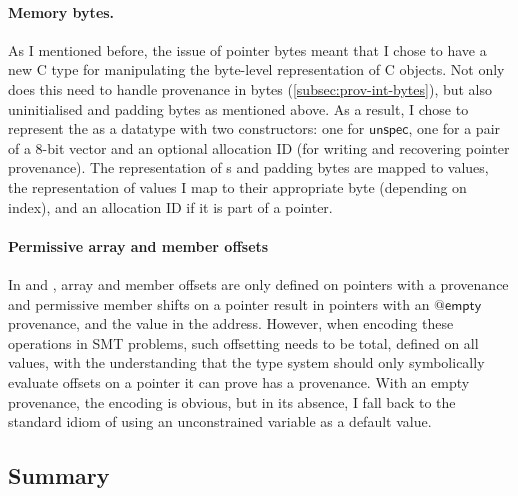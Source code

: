 \paragraph{Memory bytes.}%
As I mentioned before, the issue of pointer bytes meant that I chose to have a
new C type for manipulating the byte-level representation of C objects. Not
only does this need to handle provenance in bytes
(\cref{subsec:prov-int-bytes}), but also uninitialised and padding bytes as
mentioned above. As a result, I chose to represent the  as
a datatype with two constructors: one for $\mathsf{unspec}$, one for a pair of
a 8-bit vector and an optional allocation ID (for writing and recovering
pointer provenance). The representation of s and padding bytes
are mapped to  values, the representation of 
values I map to their appropriate byte (depending on
index), and an allocation ID if it is part of a pointer.

\paragraph{Permissive array and member offsets}%
In  and , array and member offsets are only defined on
pointers with a provenance and permissive member shifts on a 
pointer result in pointers with an $@\mathsf{empty}$ provenance, and the
 value in the address. However, when encoding these
operations in SMT problems, such offsetting needs to be total, defined on all
values, with the understanding that the type system should only symbolically
evaluate offsets on a pointer it can prove has a provenance. With an empty
provenance, the encoding is obvious, but in its absence, I fall back to the
standard idiom of using an unconstrained variable as a default value.

\subsection{Summary}


